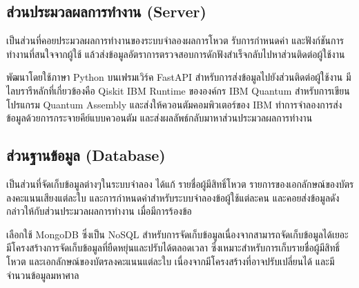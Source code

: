 \subsection{ส่วนประมวลผลการทำงาน (Server)}
เป็นส่วนที่คอยประมวลผลการทำงานของระบบจำลองผลการโหวต รับการกำหนดค่า และฟังก์ชันการทำงานที่สนใจจากผู้ใช้
แล้วส่งข้อมูลอัตราการตรวจสอบการดักฟังสำเร็จกลับไปหาส่วนติดต่อผู้ใช้งาน

พัฒนาโดยใช้ภาษา Python บนเฟรมเวิร์ค FastAPI สำหรับการส่งข้อมูลไปยังส่วนติดต่อผู้ใช้งาน
มีไลบรารีหลักที่เกี่ยวข้องคือ Qiskit IBM Runtime ขององค์กร IBM Quantum 
สำหรับการเขียนโปรแกรม Quantum Assembly และส่งให้ควอนตัมคอมพิวเตอร์ของ IBM ทำการจำลองการส่งข้อมูลด้วยการกระจายคีย์แบบควอนตัม และส่งผลลัพธ์กลับมาหาส่วนประมวลผลการทำงาน

\subsection{ส่วนฐานข้อมูล (Database)}
เป็นส่วนที่จัดเก็บข้อมูลต่างๆในระบบจำลอง ได้แก้ รายชื่อผู้มีสิทธิ์โหวต รายการของเอกลักษณ์ของบัตรลงคะแนนเสียงแต่ละใบ 
และการกำหนดค่าสำหรับระบบจำลองข้อผู้ใช้แต่ละคน และคอยส่งข้อมูลดังกล่าวให้กับส่วนประมวลผลการทำงาน เมื่อมีการร้องข้อ

เลือกใช้ MongoDB ซึ่งเป็น NoSQL สำหรับการจัดเก็บข้อมูลเนื่องจากสามารถจัดเก็บข้อมูลได้เยอะ มีโครงสร้างการจัดเก็บข้อมูลที่ยืดหยุ่นและปรับได้ตลอดเวลา
ซึ่งเหมาะสำหรับการเก็บรายชื่อผู้มีสิทธิ์โหวต และเอกลักษณ์ของบัตรลงคะแนนแต่ละใบ เนื่องจากมีโครงสร้างที่อาจปรับเปลี่ยนได้ และมีจำนวนข้อมูลมหาศาล

